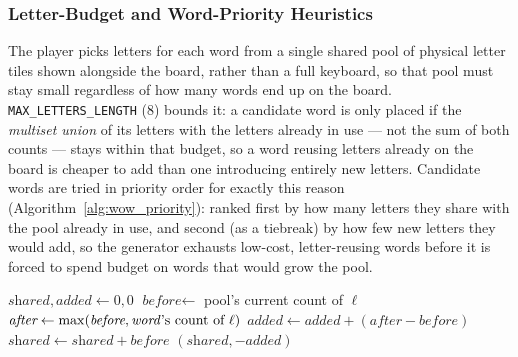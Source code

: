         \subsubsection{Letter-Budget and Word-Priority Heuristics}
        The player picks letters for each word from a single shared pool of physical letter tiles shown alongside the board, rather than a full keyboard, so that pool must stay small regardless of how many words end up on the board. \texttt{MAX\_LETTERS\_LENGTH} (8) bounds it: a candidate word is only placed if the \emph{multiset union} of its letters with the letters already in use --- not the sum of both counts --- stays within that budget, so a word reusing letters already on the board is cheaper to add than one introducing entirely new letters. Candidate words are tried in priority order for exactly this reason (Algorithm~\ref{alg:wow_priority}): ranked first by how many letters they share with the pool already in use, and second (as a tiebreak) by how few new letters they would add, so the generator exhausts low-cost, letter-reusing words before it is forced to spend budget on words that would grow the pool.

        \begin{algorithm}
        \caption{Word priority for placement ordering}
        \label{alg:wow_priority}
        \begin{algorithmic}[1]
        \STATE $\textit{shared}, \textit{added} \gets 0, 0$
            \STATE $\textit{before} \gets$ pool's current count of $\ell$
            \STATE $\textit{after} \gets \max(\textit{before}, \text{\textit{word}'s count of } \ell)$
                \STATE $\textit{added} \gets \textit{added} + (\textit{after} - \textit{before})$ 
            \ELSE
                \STATE $\textit{shared} \gets \textit{shared} + \textit{before}$ 
            \ENDIF
        \ENDFOR
        \RETURN $(\textit{shared}, -\textit{added})$ 
        \end{algorithmic}
        \end{algorithm}

